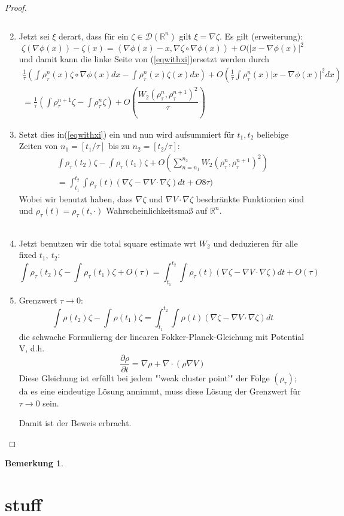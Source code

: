 \documentclass[11pt,a4paper,notitlepage]{scrreprt}
\newcommand{\RR}{\mathbb{R}}
\newtheorem{bem}[defi]{Bemerkung}
\begin{document}
\begin{proof}
\begin{enumerate}
\begin{equation}
\end{equation}
\item Jetzt sei $\xi$ derart, dass für ein $\zeta\in\mathcal{D}(\RR^n)$ gilt $\xi=\nabla\zeta$. Es gilt (erweiterung):
\begin{equation}
\zeta(\nabla\phi(x))-\zeta(x)=\left\langle\nabla\phi(x)-x,\nabla\zeta\circ\nabla\phi(x)\right\rangle+O(\vert x-\nabla\phi(x)\vert^2
\end{equation}
und damit kann die linke Seite von (\ref{eqwithxi})ersetzt werden durch
\begin{align*}
\frac{1}{\tau}\left(\int \rho_\tau^n(x)\zeta\circ\nabla\phi(x)dx-\int\rho_\tau^n(x)\zeta(x)dx\right)+O\left(\frac{1}{\tau}\int\rho_\tau^n(x)\vert x-\nabla\phi(x)\vert^2dx\right)\\
=\frac{1}{\tau}\left(\int\rho_\tau^{n+1}\zeta-\int\rho_\tau^n\zeta\right)+O\left(\dfrac{W_2(\rho_\tau^n,\rho_\tau^{n+1})^2}{\tau}\right)
\end{align*}
\item Setzt dies in(\ref{eqwithxi}) ein und  nun wird aufsummiert für $t_1,t_2$ beliebige Zeiten von $n_1=[t_1/\tau]$ bis zu $n_2=[t_2/\tau]$:
\begin{eqnarray}
\int\rho_\tau(t_2)\zeta-\int\rho_\tau(t_1)\zeta+O\left(\sum_{n=n_1}^{n_2}W_2(\rho_\tau^n,\rho_\tau^{n+1})^2\right)\\
=\int_{t_1}^{t_2}\int\rho_\tau(t)(\nabla\zeta-\nabla V\cdot\nabla\zeta)dt+O8\tau)
\end{eqnarray}
Wobei wir benutzt haben, dass $\nabla\zeta$ und $\nabla V\cdot\nabla\zeta$ beschränkte Funktionien sind und $\rho_\tau(t)=\rho_\tau(t,\cdot)$ Wahrscheinlichkeitsmaß auf $\RR^n$.\\\\
\item Jetzt benutzen wir die total square estimate wrt $W_2$ und deduzieren für alle fixed $t_1,~t_2$:
\begin{equation}
\int\rho_\tau(t_2)\zeta-\int\rho_\tau(t_1)\zeta+O(\tau)=\int_{t_1}^{t_2}\int\rho_\tau(t)(\nabla\zeta-\nabla V\cdot\nabla\zeta)dt+O(\tau)
\end{equation}
\item Grenzwert $\tau\to 0$:
\begin{equation}
\int\rho(t_2)\zeta-\int\rho(t_1)\zeta=\int_{t_1}^{t_2}\int\rho(t)(\nabla\zeta-\nabla V\cdot\nabla\zeta)dt
\end{equation}
die schwache Formulierng der linearen Fokker-Planck-Gleichung mit Potential V, d.h.
\begin{equation}
\dfrac{\partial\rho}{\partial t}=\nabla\rho+\nabla\cdot(\rho\nabla V)
\end{equation}
Diese Gleichung ist erfüllt bei jedem "'weak cluster point'" der Folge $(\rho_\tau)$; da es eine eindeutige Lösung annimmt, muss diese Lösung der Grenzwert für $\tau\to 0$ sein.

Damit ist der Beweis erbracht.
\end{enumerate}
\end{proof}

\begin{bem}
\end{bem}

\section{stuff}
\end{document}
